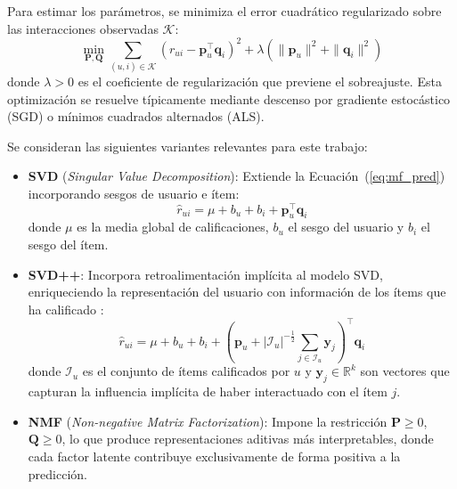 Para estimar los parámetros, se minimiza el error cuadrático regularizado sobre las interacciones observadas $\mathcal{K}$:
\begin{equation} \label{eq:mf_loss}
	\min_{\mathbf{P}, \mathbf{Q}} \sum_{(u,i) \in \mathcal{K}} \left( r_{ui} - \mathbf{p}_u^\top \mathbf{q}_i \right)^2 + \lambda \left( \|\mathbf{p}_u\|^2 + \|\mathbf{q}_i\|^2 \right)
\end{equation}
donde $\lambda > 0$ es el coeficiente de regularización que previene el sobreajuste. Esta optimización se resuelve típicamente mediante descenso por gradiente estocástico (SGD) o mínimos cuadrados alternados (ALS).

Se consideran las siguientes variantes relevantes para este trabajo:
\begin{itemize}
	\item \textbf{SVD} (\textit{Singular Value Decomposition}): Extiende la Ecuación~(\ref{eq:mf_pred}) incorporando sesgos de usuario e ítem:
	      \begin{equation} \label{eq:svd_bias}
		      \hat{r}_{ui} = \mu + b_u + b_i + \mathbf{p}_u^\top \mathbf{q}_i
	      \end{equation}
	      donde $\mu$ es la media global de calificaciones, $b_u$ el sesgo del usuario y $b_i$ el sesgo del ítem.

	\item \textbf{SVD++}: Incorpora retroalimentación implícita al modelo SVD, enriqueciendo la representación del usuario con información de los ítems que ha calificado \citep{koren_factorization_2008}:
	      \begin{equation} \label{eq:svdpp}
		      \hat{r}_{ui} = \mu + b_u + b_i + \left( \mathbf{p}_u + |\mathcal{I}_u|^{-\frac{1}{2}} \sum_{j \in \mathcal{I}_u} \mathbf{y}_j \right)^\top \mathbf{q}_i
	      \end{equation}
	      donde $\mathcal{I}_u$ es el conjunto de ítems calificados por $u$ y $\mathbf{y}_j \in \mathbb{R}^k$ son vectores que capturan la influencia implícita de haber interactuado con el ítem $j$.

	\item \textbf{NMF} (\textit{Non-negative Matrix Factorization}): Impone la restricción $\mathbf{P} \geq 0$, $\mathbf{Q} \geq 0$, lo que produce representaciones aditivas más interpretables, donde cada factor latente contribuye exclusivamente de forma positiva a la predicción.
\end{itemize}

